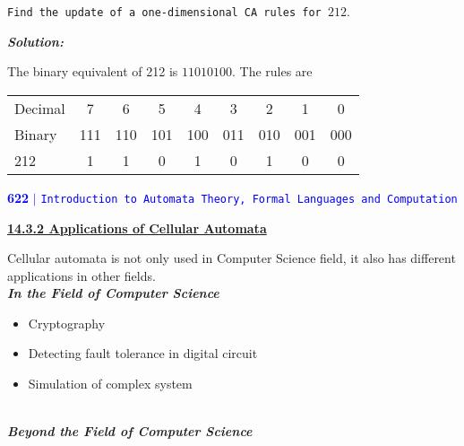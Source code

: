 \documentclass[a4]{article}
\begin{document}
	
	\hspace*{0.1cm} \texttt{Find the update of a one-dimensional CA rules for $212 .$}
	\vspace*{0.2cm}\\
	\large{\textbf{\textit{{Solution:}}}
	\vspace*{0.2cm}
	
    The binary equivalent of 212 is $11010100 .$
    The rules are 
    
    \vspace*{0.3cm} 
    \begin{center}
    	\begin{tabular}{lcccccccc}
    		\hline Decimal & 7 & 6 & 5 & 4 & 3 & 2 & 1 & 0 \\
    		Binary & 111 & 110 & 101 & 100 & 011 & 010 & 001 & 000 \\
    		212 & 1 & 1 & 0 & 1 & 0 & 1 & 0 & 0 \\
    	\hline
  	  \end{tabular}
    \end{center}

	\newpage
	\begin{flushleft}
		\textcolor{blue}{\textbf{622}\hspace*{0.1cm} \textbf{$|$} \hspace*{0.1cm} \texttt{Introduction to Automata Theory, Formal Languages and Computation}}
	\end{flushleft}
	\vspace*{0.5cm}
	\begin{flushleft}
		{\Large{\underline{\textbf{14.3.2 Applications of Cellular Automata}}}}
	\end{flushleft}

	\vspace*{0.5cm}
	Cellular automata is not only used in Computer Science field, it  also has different applications in other fields.
	\vspace*{0.2cm}\\
	\large{\textbf{\textit{In the Field of Computer Science}}}
	\vspace*{0.2cm}
		
	\begin{itemize}
		\item Cryptography\vspace*{0.1cm}
		\item Detecting fault tolerance in digital circuit\vspace*{0.1cm}
		\item Simulation of complex system\vspace*{0.1cm}
	\end{itemize}
	\vspace*{0.2cm}\\
	\large{\textbf{\textit{Beyond the Field of Computer Science}}}
	\vspace*{0.2cm}
	
}
\end{document}
